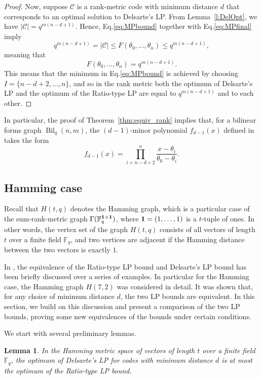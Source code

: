 \documentclass[a4paper]{article}
\newtheorem{lemma}[formula]{Lemma}
\newcommand{\F}{\mathbb{F}}
\newcommand{\Bil}{\operatorname{Bil}}
\begin{document}
\begin{proof}
Now, suppose $\mathcal{C}$ is a rank-metric code with minimum distance $d$ that corresponds to an optimal solution to Delsarte's LP. From Lemma~\ref{l:DelOpt}, we have $|\mathcal{C}|=q^{m(n-d+1)}$. Hence, Eq.\:\eqref{eq:MPbound} together with Eq.\:\eqref{eq:MPfinal} imply
$$q^{m(n-d+1)}=|\mathcal{C}|\leq F(\theta_0,\dots,\theta_n)\leq q^{m(n-d+1)},$$
meaning that $$F(\theta_0,\dots,\theta_n)= q^{m(n-d+1)}.$$
This means that the minimum in Eq.\:\eqref{eq:MPbound} is achieved by choosing $I=\{n-d+2,\dots,n\}$, and so in the rank metric both the optimum of Delsarte's LP and the optimum of the Ratio-type LP are equal to $q^{m(n-d+1)}$ and to each other.
\end{proof}

In particular, the proof of Theorem~\ref{thm:equiv_rank} implies that, for a bilinear forms graph $\Bil_q(n,m)$, the $(d-1)$-minor polynomial $f_{d-1}(x)$ defined in~\cite{F2020} takes the form
$$f_{d-1}(x)=\prod\limits_{i=n-d+2}^n\frac{x-\theta_i}{\theta_0-\theta_i}.$$


\subsection{Hamming case}

Recall that $H(t,q)$ denotes the Hamming graph, which is a particular case of the sum-rank-metric graph $\Gamma(\F_q^{\bf 1\times 1})$, where ${\bf1}=(1,\dots,1)$ is a $t$-tuple of ones. In other words, the vertex set of the graph $H(t,q)$ consists of all vectors of length $t$ over a finite field $\F_q$, and two vertices are adjacent if the Hamming distance between the two vectors is exactly $1$.

In \cite{F2020}, the equivalence of the Ratio-type LP bound and Delsarte's LP bound has been briefly discussed over a series of examples. In particular for the Hamming case, the Hamming graph $H(7,2)$ was considered in detail. It was shown that, for any choice of minimum distance $d$, the two LP bounds are equivalent. In this section, we build on this discussion and present a comparison of the two LP bounds, proving some new equivalences of the bounds under certain conditions.

We start with several preliminary lemmas.

\begin{lemma}\label{l:Ham_Del_leq_RT}
    In the Hamming metric space of vectors of length $t$ over a finite field $\F_q$, the optimum of Delsarte's LP for codes with minimum distance $d$ is at most the optimum of the Ratio-type LP bound.
\end{lemma}
\end{document}
